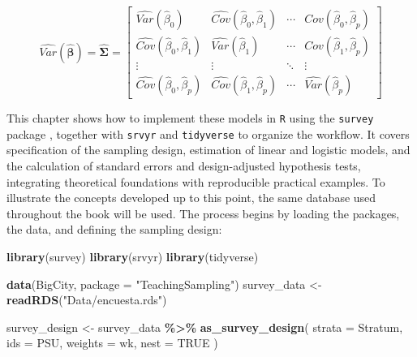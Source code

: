 \documentclass[
  english,
  12pt,
]{book}
\newenvironment{Shaded}{\begin{snugshade}}{\end{snugshade}}
\newcommand{\AttributeTok}[1]{\textcolor[rgb]{0.13,0.29,0.53}{#1}}
\newcommand{\ConstantTok}[1]{\textcolor[rgb]{0.56,0.35,0.01}{#1}}
\newcommand{\FunctionTok}[1]{\textcolor[rgb]{0.13,0.29,0.53}{\textbf{#1}}}
\newcommand{\NormalTok}[1]{#1}
\newcommand{\OtherTok}[1]{\textcolor[rgb]{0.56,0.35,0.01}{#1}}
\newcommand{\SpecialCharTok}[1]{\textcolor[rgb]{0.81,0.36,0.00}{\textbf{#1}}}
\newcommand{\StringTok}[1]{\textcolor[rgb]{0.31,0.60,0.02}{#1}}
\begin{document}
\[
\widehat{Var}(\hat{\boldsymbol{\beta}}) = \hat{\boldsymbol\Sigma} =
\begin{bmatrix}
\widehat{Var}(\hat{\beta}_{0}) & \widehat{Cov}(\hat{\beta}_{0},\hat{\beta}_{1}) & \cdots & \widehat{Cov}(\hat{\beta}_{0},\hat{\beta}_{p}) \\
\widehat{Cov}(\hat{\beta}_{0},\hat{\beta}_{1}) & \widehat{Var}(\hat{\beta}_{1}) & \cdots & \widehat{Cov}(\hat{\beta}_{1},\hat{\beta}_{p}) \\
\vdots & \vdots & \ddots & \vdots \\
\widehat{Cov}(\hat{\beta}_{0},\hat{\beta}_{p}) & \widehat{Cov}(\hat{\beta}_{1},\hat{\beta}_{p}) & \cdots & \widehat{Var}(\hat{\beta}_{p})
\end{bmatrix}
\]

This chapter shows how to implement these models in \texttt{R} using the \texttt{survey} package \citep{Lumley2024}, together with \texttt{srvyr} \citep{Freedman2024} and \texttt{tidyverse} \citep{tidyverse2026} to organize the workflow. It covers specification of the sampling design, estimation of linear and logistic models, and the calculation of standard errors and design-adjusted hypothesis tests, integrating theoretical foundations with reproducible practical examples. To illustrate the concepts developed up to this point, the same database used throughout the book will be used. The process begins by loading the packages, the data, and defining the sampling design:

\begin{Shaded}
\begin{Highlighting}[]
\FunctionTok{library}\NormalTok{(survey)}
\FunctionTok{library}\NormalTok{(srvyr)}
\FunctionTok{library}\NormalTok{(tidyverse)}

\FunctionTok{data}\NormalTok{(BigCity, }\AttributeTok{package =} \StringTok{"TeachingSampling"}\NormalTok{)}
\NormalTok{survey\_data }\OtherTok{\textless{}{-}} \FunctionTok{readRDS}\NormalTok{(}\StringTok{"Data/encuesta.rds"}\NormalTok{)}

\NormalTok{survey\_design }\OtherTok{\textless{}{-}}\NormalTok{ survey\_data }\SpecialCharTok{\%\textgreater{}\%}
  \FunctionTok{as\_survey\_design}\NormalTok{(}
    \AttributeTok{strata =}\NormalTok{ Stratum,}
    \AttributeTok{ids =}\NormalTok{ PSU,}
    \AttributeTok{weights =}\NormalTok{ wk,}
    \AttributeTok{nest =} \ConstantTok{TRUE}
\NormalTok{  )}
\end{Highlighting}
\end{Shaded}
\end{document}
